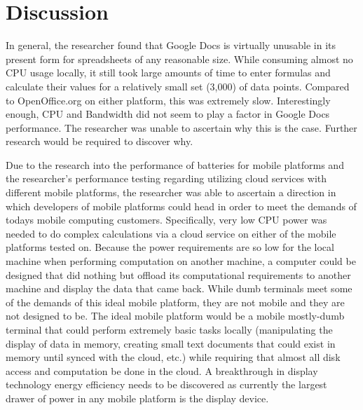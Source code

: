 \section{Discussion}

In general, the researcher found that Google Docs is virtually unusable in its
present form for spreadsheets of any reasonable size.  While consuming almost no
CPU usage locally, it still took large amounts of time to enter formulas and
calculate their values for a relatively small set (3,000) of data points.
Compared to OpenOffice.org on either platform, this was extremely slow.
Interestingly enough, CPU and Bandwidth did not seem to play a factor in Google
Docs performance.  The researcher was unable to ascertain why this is the case.
Further research would be required to discover why.


Due to the research into the performance of batteries for mobile platforms and
the researcher's performance testing regarding utilizing cloud services with
different mobile platforms, the researcher was able to ascertain a direction in
which developers of mobile platforms could head in order to meet the demands of
todays mobile computing customers.  Specifically, very low CPU power was needed
to do complex calculations via a cloud service on either of the mobile platforms
tested on.  Because the power requirements are so low for the local machine when
performing computation on another machine, a computer could be designed that did
nothing but offload its computational requirements to another machine and
display the data that came back.  While dumb terminals meet some of the demands
of this ideal mobile platform, they are not mobile and they are not designed to
be.  The ideal mobile platform would be a mobile mostly-dumb terminal that could
perform extremely basic tasks locally (manipulating the display of data in
memory, creating small text documents that could exist in memory until synced
with the cloud, etc.) while requiring that almost all disk access and
computation be done in the cloud.  A breakthrough in display technology energy
efficiency needs to be discovered as currently the largest drawer of power in
any mobile platform is the display device.

